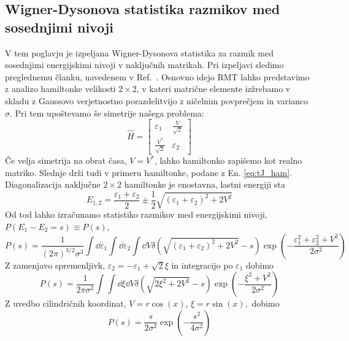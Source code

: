  \subsection{Wigner-Dysonova statistika razmikov med sosednjimi nivoji} 
 V tem poglavju je izpeljana Wigner-Dysonova statistika za razmik med sosednjimi energijskimi nivoji v naključnih matrikah. Pri izpeljavi sledimo preglednemu članku, navedenem v Ref.~\cite{d2016quantum}.
 Osnovno idejo RMT lahko predstavimo z analizo hamiltonke velikosti $2\times2$, v kateri matrične elemente izžrebamo v skladu z Gaussovo verjetnostno porazdelitvijo z ničelnim povprečjem in varianco $\sigma$.  Pri tem upoštevamo še simetrije našega problema:
 \begin{equation}\label{eq:rnd_ham}
 \hat{H}=
 \begin{bmatrix}
 \varepsilon_1 & \frac{V}{\sqrt{2}} \\
 \frac{V^*}{\sqrt{2}} & \varepsilon_2
 \end{bmatrix}
 \end{equation}
 Če velja simetrija na obrat časa, $V=V^*$, lahko hamiltonko zapišemo kot realno matriko. Slednje drži tudi v primeru hamiltonke, podane z En. \eqref{eq:tJ_ham}. Diagonalizacija naključne $2\times2$ hamiltonke je enostavna, lastni energiji sta
 \begin{equation}
 E_{1,2}=\frac{\varepsilon_1+\varepsilon_2}{2}\pm \frac{1}{2}\sqrt{\left(\varepsilon_1 +\varepsilon_2\right)^2 + 2V^2}
 \end{equation}
 Od tod lahko izračunamo statistiko razmikov med energijskimi nivoji, $P(E_1-E_2=s)\equiv P(s),$
\begin{equation}
 P(s)=\frac{1}{\left(2\pi\right)^{3/2}\sigma^3}\int \dd\varepsilon_1\int\dd\varepsilon_2\int \dd V \delta\left(\sqrt{\left(\varepsilon_1 +\varepsilon_2\right)^2 + 2V^2}-s\right)\exp\left( -\frac{\varepsilon_1^2+\varepsilon_2^2+V^2}{2\sigma^2}\right)
 \end{equation}
 Z zamenjavo spremenljivk, $\varepsilon_2=-\varepsilon_1+\sqrt{2}\xi$ in integracijo po $\varepsilon_1$ dobimo 
 \begin{equation}
 P(s)=\frac{1}{2\pi\sigma^2}\int\int\dd\xi\dd V\delta\left(\sqrt{2\xi^2+2V^2}-s\right)\exp\left(-\frac{\xi^2+V^2}{2\sigma^2}\right)
 \end{equation}
 Z uvedbo cilindričnih koordinat, $V=r\cos(x)$, $\xi=r\sin(x),$ dobimo 
 \begin{equation}\label{eq:wigner_surmise}
 P(s)=\frac{s}{2\sigma^2}\exp\left(-\frac{s^2}{4\sigma^2} \right)
\end{equation}
